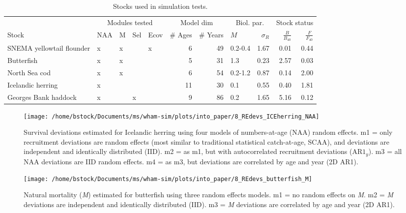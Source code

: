 \documentclass[]{article}
\begin{document}
\begin{table}

\caption{\label{tab:stock-list}Stocks used in simulation tests.}
\centering
\begin{tabular}[t]{lllllrrlrrr}
\toprule
\multicolumn{1}{c}{ } & \multicolumn{4}{c}{Modules tested} & \multicolumn{2}{c}{Model dim} & \multicolumn{2}{c}{Biol. par.} & \multicolumn{2}{c}{Stock status} \\
\cmidrule(l{3pt}r{3pt}){2-5} \cmidrule(l{3pt}r{3pt}){6-7} \cmidrule(l{3pt}r{3pt}){8-9} \cmidrule(l{3pt}r{3pt}){10-11}
Stock & NAA & M & Sel & Ecov & \# Ages & \# Years & $M$ & $\sigma_R$ & $\frac{B}{B_{40}}$ & $\frac{F}{F_{40}}$\\
\midrule
SNEMA yellowtail flounder & x & x &  & x & 6 & 49 & 0.2-0.4 & 1.67 & 0.01 & 0.44\\
Butterfish & x & x &  &  & 5 & 31 & 1.3 & 0.23 & 2.57 & 0.03\\
North Sea cod & x & x &  &  & 6 & 54 & 0.2-1.2 & 0.87 & 0.14 & 2.00\\
Icelandic herring & x &  &  &  & 11 & 30 & 0.1 & 0.55 & 0.40 & 1.81\\
Georges Bank haddock & x &  & x &  & 9 & 86 & 0.2 & 1.65 & 5.16 & 0.12\\
\bottomrule
\end{tabular}
\end{table}

\pagebreak

\begin{figure}

{\centering \texttt{[image: /home/bstock/Documents/ms/wham-sim/plots/into\_paper/8\_REdevs\_ICEherring\_NAA]} 

}

\caption{Survival deviations estimated for Icelandic herring using four models of numbers-at-age (NAA) random effects. m1 = only recruitment deviations are random effects (most similar to traditional statistical catch-at-age, SCAA), and deviations are independent and identically distributed (IID). m2 = as m1, but with autocorrelated recruitment deviations ($\text{AR1}_y$). m3 = all NAA deviations are IID random effects. m4 = as m3, but deviations are correlated by age and year (2D AR1).}\label{fig:devs-ICEherring-naa}
\end{figure}

\pagebreak

\begin{figure}

{\centering \texttt{[image: /home/bstock/Documents/ms/wham-sim/plots/into\_paper/8\_REdevs\_butterfish\_M]} 

}

\caption{Natural mortality (\textit{M}) estimated for butterfish using three random effects models. m1 = no random effects on \textit{M}. m2 = \textit{M} deviations are independent and identically distributed (IID). m3 = \textit{M} deviations are correlated by age and year (2D AR1).}\label{fig:devs-butterfish-m}
\end{figure}
\end{document}
